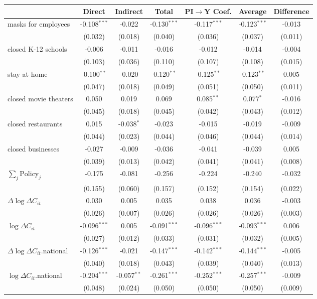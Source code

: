 
\begin{tabular}{lccccc|>{}c}
\toprule
  & Direct & Indirect & Total & PI$\to$Y Coef. & Average & Difference\\
\midrule
masks for employees & -0.108$^{***}$ & -0.022 & -0.130$^{***}$ & -0.117$^{***}$ & -0.123$^{***}$ & -0.013\\
 & (0.032) & (0.018) & (0.040) & (0.036) & (0.037) & (0.011)\\
closed K-12 schools & -0.006 & -0.011 & -0.016 & -0.012 & -0.014 & -0.004\\
 & (0.103) & (0.036) & (0.110) & (0.107) & (0.108) & (0.015)\\
stay at home & -0.100$^{**}$ & -0.020 & -0.120$^{**}$ & -0.125$^{**}$ & -0.123$^{**}$ & 0.005\\
 & (0.047) & (0.018) & (0.049) & (0.051) & (0.050) & (0.011)\\
closed movie theaters & 0.050 & 0.019 & 0.069 & 0.085$^{**}$ & 0.077$^{*}$ & -0.016\\
 & (0.045) & (0.018) & (0.045) & (0.042) & (0.043) & (0.012)\\
closed restaurants & 0.015 & -0.038$^{*}$ & -0.023 & -0.015 & -0.019 & -0.009\\
 & (0.044) & (0.023) & (0.044) & (0.046) & (0.044) & (0.014)\\
closed businesses & -0.027 & -0.009 & -0.036 & -0.041 & -0.039 & 0.005\\
 & (0.039) & (0.013) & (0.042) & (0.041) & (0.041) & (0.008)\\
$\sum_j \mathrm{Policy}_j$ & -0.175 & -0.081 & -0.256 & -0.224 & -0.240 & -0.032\\
 & (0.155) & (0.060) & (0.157) & (0.152) & (0.154) & (0.022)\\
$\Delta \log \Delta C_{it}$ & 0.030 & 0.005 & 0.035 & 0.038 & 0.036 & -0.003\\
 & (0.026) & (0.007) & (0.026) & (0.026) & (0.026) & (0.003)\\
$\log \Delta C_{it}$ & -0.096$^{***}$ & 0.005 & -0.091$^{***}$ & -0.096$^{***}$ & -0.093$^{***}$ & 0.006\\
 & (0.027) & (0.012) & (0.033) & (0.031) & (0.032) & (0.005)\\
$\Delta \log \Delta C_{it}$.national & -0.126$^{***}$ & -0.021 & -0.147$^{***}$ & -0.142$^{***}$ & -0.144$^{***}$ & -0.005\\
 & (0.040) & (0.018) & (0.043) & (0.039) & (0.040) & (0.013)\\
$\log \Delta C_{it}$.national & -0.204$^{***}$ & -0.057$^{**}$ & -0.261$^{***}$ & -0.252$^{***}$ & -0.257$^{***}$ & -0.009\\
 & (0.048) & (0.024) & (0.050) & (0.050) & (0.050) & (0.009)\\
\bottomrule
\end{tabular}